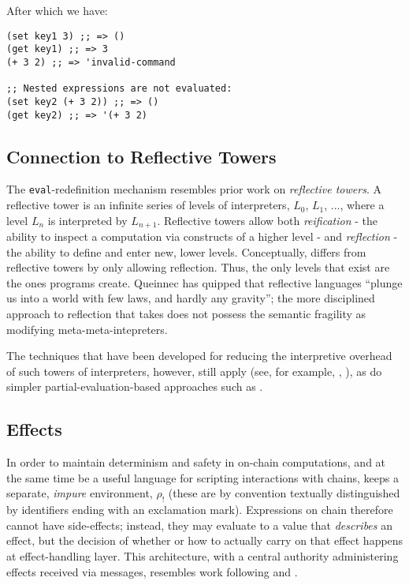 After which we have:

\begin{verbatim}
(set key1 3) ;; => ()
(get key1) ;; => 3
(+ 3 2) ;; => 'invalid-command

;; Nested expressions are not evaluated:
(set key2 (+ 3 2)) ;; => ()
(get key2) ;; => '(+ 3 2)
\end{verbatim}

\subsection{Connection to Reflective Towers} The \texttt{eval}-redefinition
mechanism resembles prior work on \textit{reflective towers}. A reflective
tower is an infinite series of levels of interpreters, $L_0$, $L_1$, ..., where
a level $L_n$ is interpreted by $L_{n+1}$. Reflective towers allow both
\textit{reification} - the ability to inspect a computation via constructs of a
higher level - and \textit{reflection} - the ability to define and enter new,
lower levels. Conceptually, \rad differs from reflective towers by only
allowing reflection. Thus, the only levels that exist are the ones programs
create. Queinnec has quipped that reflective languages ``plunge us into a world
with few laws, and hardly any gravity''\cite{Queinnec1994}; the more disciplined approach to
reflection that \rad takes does not possess the semantic fragility as modifying
meta-meta-intepreters.

The techniques that have been developed for reducing the interpretive overhead
of such towers of interpreters, however, still
apply (see, for example, \cite{Amin2017}, \cite{Asai2014}), as do simpler
partial-evaluation-based approaches such as \cite{Brown2017}.



\subsection{Effects} In order to maintain determinism and safety in on-chain
computations, and at the same time be a useful language for scripting
interactions with chains, \rad keeps a separate, \textit{impure} environment,
$\rho_{!}$ (these are by convention textually distinguished by identifiers
ending with an exclamation mark). Expressions on chain therefore cannot have
side-effects; instead, they may evaluate to a value that \textit{describes} an effect,
but the decision of whether or how to actually carry on that effect happens at
effect-handling layer. This architecture, with a central authority
administering effects received via messages, resembles work following
\cite{Cartwright1994} and \cite{Bauer2003}.


